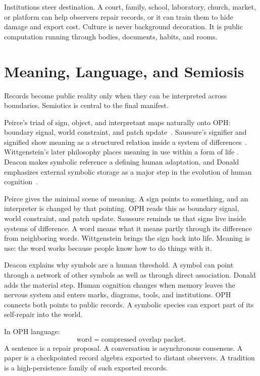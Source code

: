\documentclass[11pt]{article}
\theoremstyle{remark}
\theoremstyle{plain}
\begin{document}
Institutions steer destination. A court, family, school, laboratory,
church, market, or platform can help observers repair records, or it can train
them to hide damage and export cost. Culture is never background decoration. It
is public computation running through bodies, documents, habits, and rooms.

\section{Meaning, Language, and Semiosis}

Records become public reality only when they can be interpreted across
boundaries. Semiotics is central to the final manifest.

Peirce's triad of sign, object, and interpretant maps naturally onto OPH:
boundary signal, world constraint, and patch update~\cite{Peirce1931}.
Saussure's signifier and signified show meaning as a structured relation
inside a system of differences~\cite{Saussure1916}.
Wittgenstein's later philosophy places meaning in use within a form of life
\cite{Wittgenstein1953}. Deacon makes symbolic reference a defining human
adaptation, and Donald emphasizes external symbolic storage as a major step in
the evolution of human cognition~\cite{Deacon1997,Donald1991}.

Peirce gives the minimal scene of meaning. A sign points to something, and an
interpreter is changed by that pointing. OPH reads this as boundary signal,
world constraint, and patch update. Saussure reminds us that signs live inside
systems of difference. A word means what it means partly through its difference
from neighboring words. Wittgenstein brings the sign back into life. Meaning is use:
the word works because people know how to do things with it.

Deacon explains why symbols are a human threshold. A symbol can point through a
network of other symbols as well as through direct association. Donald adds the
material step. Human cognition changes when memory leaves the nervous system and
enters marks, diagrams, tools, and institutions. OPH connects both points to
public records. A symbolic species can export part of its self-repair into the
world.

In OPH language:
\[
\boxed{
\text{word}=\text{compressed overlap packet}.
}
\]
A sentence is a repair proposal. A conversation is asynchronous consensus. A
paper is a checkpointed record algebra exported to distant observers. A
tradition is a high-persistence family of such exported records.
\end{document}
